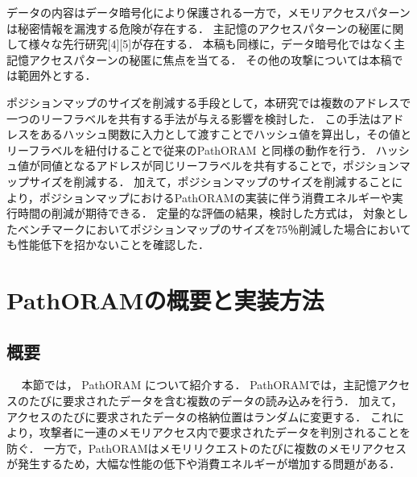 \documentclass{jarticle}
\begin{document}
データの内容はデータ暗号化により保護される一方で，メモリアクセスパターンは秘密情報を漏洩する危険が存在する．
主記憶のアクセスパターンの秘匿に関して様々な先行研究[4][5]が存在する．
本稿も同様に，データ暗号化ではなく主記憶アクセスパターンの秘匿に焦点を当てる．
その他の攻撃については本稿では範囲外とする．

ポジションマップのサイズを削減する手段として，本研究では複数のアドレスで一つのリーフラベルを共有する手法が与える影響を検討した．
この手法はアドレスをあるハッシュ関数に入力として渡すことでハッシュ値を算出し，その値とリーフラベルを紐付けることで従来のPathORAM と同様の動作を行う．
ハッシュ値が同値となるアドレスが同じリーフラベルを共有することで，ポジションマップサイズを削減する．
加えて，ポジションマップのサイズを削減することにより，ポジションマップにおけるPathORAMの実装に伴う消費エネルギーや実行時間の削減が期待できる．
定量的な評価の結果，検討した方式は，
対象としたベンチマークにおいてポジションマップのサイズを75％削減した場合においても性能低下を招かないことを確認した．





\section{PathORAMの概要と実装方法}
\subsection{概要}
本節では， PathORAM について紹介する．
PathORAMでは，主記憶アクセスのたびに要求されたデータを含む複数のデータの読み込みを行う．
加えて，アクセスのたびに要求されたデータの格納位置はランダムに変更する．
これにより，攻撃者に一連のメモリアクセス内で要求されたデータを判別されることを防ぐ．
一方で，PathORAMはメモリリクエストのたびに複数のメモリアクセスが発生するため，大幅な性能の低下や消費エネルギーが増加する問題がある．
\end{document}
